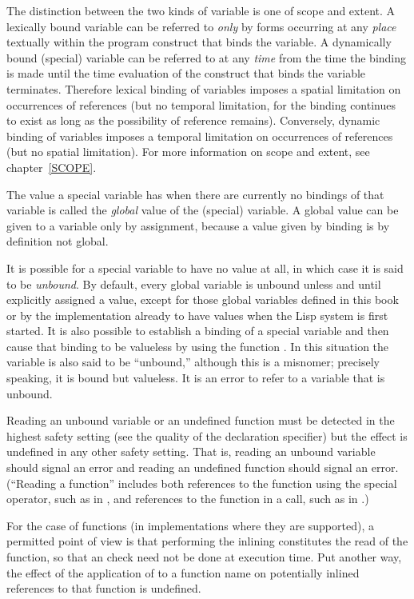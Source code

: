 The distinction between the two kinds of variable is one of scope
and extent.  A lexically bound variable can be referred to \emph{only}
by forms occurring at any \emph{place} textually within the program construct that
binds the variable.  A dynamically bound (special) variable can
be referred to at any \emph{time} from the time the binding is made
until the time evaluation of the construct that binds the variable
terminates.  Therefore lexical binding of variables
imposes a spatial limitation
on occurrences of references (but no temporal limitation, for the
binding continues to exist as long as the possibility of reference
remains).  Conversely, dynamic binding of variables imposes a temporal
limitation on occurrences of references (but no spatial limitation).
For more information on scope and extent, see chapter~\ref{SCOPE}.

The value a special variable has when there are currently
no bindings of that variable is called the \emph{global} value of the
(special) variable.
A global value can be given to a variable only by assignment,
because a value given by binding is by definition not global.

It is possible for a special variable to have no value at all,
in which case it is said to be \emph{unbound}.
By default, every global variable is unbound unless and until
explicitly assigned a value, except for those global variables
defined in this book or by the implementation already to have values
when the Lisp system is first started.
It is also possible to establish a binding of a special variable
and then cause that binding to be valueless by using the
function .  In this situation the variable
is also said to be ``unbound,'' although this is a misnomer;
precisely speaking, it is bound but valueless.
It is an error to refer to a variable that is unbound.

Reading an unbound variable or an undefined function
must be detected in the highest safety setting (see the
 quality of the  declaration specifier)
but the effect is undefined in any other safety setting. That is,
reading an unbound variable should signal an error and
reading an undefined function should signal an error.
(``Reading a function'' includes
both references to the function using the 
special operator, such as  in , and references to the
function in a call, such as  in .)

For the case of  functions (in implementations where they are
supported), a permitted point of view is that performing the inlining
constitutes the read of the function, so that an 
check need not be done at
execution time. Put another way, the effect of the application of
 to a function name
on potentially inlined references to that function is undefined.

